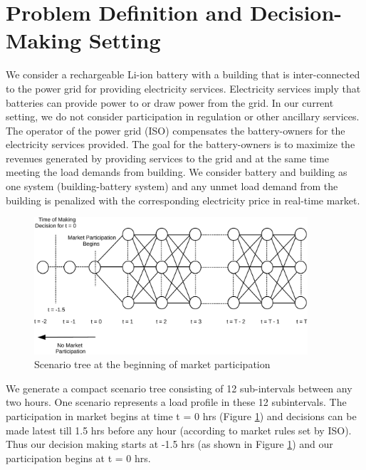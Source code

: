 \documentclass[11pt,twoside]{article}
\begin{document}
\section{Problem Definition and Decision-Making Setting}\label{sec:setting}
We consider a rechargeable Li-ion battery with a building that is inter-connected to the power grid for providing electricity services. Electricity services imply that batteries can provide power to or draw power from the grid. In our current setting, we do not consider participation in regulation or other ancillary services. The operator of the power grid (ISO) compensates the battery-owners for the electricity services provided. The goal for the battery-owners is to maximize the revenues generated by providing services to the grid and at the same time meeting the load demands from building. We consider battery and building as one system (building-battery system) and any unmet load demand from the building is penalized with the corresponding electricity price in real-time market.\\
\begin{figure}[h!]
\begin{center}
\includegraphics[width=4in]{Figures/scenario_tree-crop.pdf} \caption{Scenario tree at the beginning of market participation}\label{fig:scenario_tree}\end{center}
\end{figure}
We generate a compact scenario tree consisting of 12 sub-intervals between any two hours. One scenario represents a load profile in these 12 subintervals. The participation in market begins at time t = 0 hrs (Figure \ref{fig:scenario_tree}) and decisions can be made latest till 1.5 hrs before any hour (according to market rules set by ISO). Thus our decision making starts at -1.5 hrs (as shown in Figure \ref{fig:scenario_tree}) and our participation begins at t = 0 hrs.   
\end{document}

